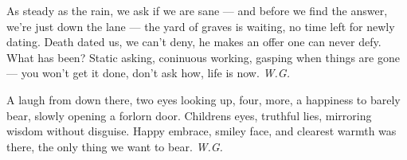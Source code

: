 As steady as the rain, 
we ask if we are sane --- 
and before we find the answer, 
we're just down the lane --- 
the yard of graves is waiting, 
no time left for newly dating. 
Death dated us, we can't deny, 
he makes an offer one can never defy. 
What has been? Static asking, 
coninuous working, gasping 
when things are gone --- 
you won't get it done, 
don't ask how, 
life is now. 
\emph{W.G.}

A laugh from down there, 
two eyes looking up, four, more, 
a happiness to barely bear, 
slowly opening a forlorn door. 
Childrens eyes, 
truthful lies, 
mirroring wisdom
without disguise. 
Happy embrace, 
smiley face, 
and clearest warmth was there, 
the only thing we want to bear. 
\emph{W.G.}

